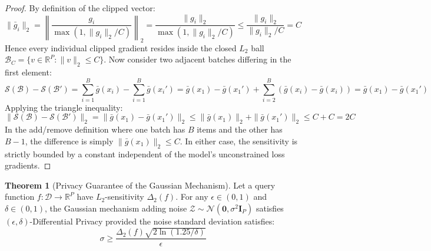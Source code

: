\documentclass[11pt,a4paper]{article}
\theoremstyle{definition}
\newtheorem{theorem}{\textbf{Theorem}}[section]
\begin{document}
\begin{proof}
By definition of the clipped vector:
\begin{equation}
\|\bar{g}_i\|_2 = \left\| \frac{g_i}{\max(1, \|g_i\|_2 / C)} \right\|_2 = \frac{\|g_i\|_2}{\max(1, \|g_i\|_2 / C)} \le \frac{\|g_i\|_2}{\|g_i\|_2 / C} = C
\end{equation}
Hence every individual clipped gradient resides inside the closed $L_2$ ball $\mathcal{B}_C = \{v \in \mathbb{R}^P : \|v\|_2 \le C\}$.
Now consider two adjacent batches differing in the first element:
\begin{equation}
\mathcal{S}(\mathcal{B}) - \mathcal{S}(\mathcal{B}') = \sum_{i=1}^B \bar{g}(x_i) - \sum_{i=1}^B \bar{g}(x_i') = \bar{g}(x_1) - \bar{g}(x_1') + \sum_{i=2}^B (\bar{g}(x_i) - \bar{g}(x_i)) = \bar{g}(x_1) - \bar{g}(x_1')
\end{equation}
Applying the triangle inequality:
\begin{equation}
\|\mathcal{S}(\mathcal{B}) - \mathcal{S}(\mathcal{B}')\|_2 = \|\bar{g}(x_1) - \bar{g}(x_1')\|_2 \le \|\bar{g}(x_1)\|_2 + \|\bar{g}(x_1')\|_2 \le C + C = 2C
\end{equation}
In the add/remove definition where one batch has $B$ items and the other has $B-1$, the difference is simply $\|\bar{g}(x_1)\|_2 \le C$. In either case, the sensitivity is strictly bounded by a constant independent of the model's unconstrained loss gradients.
\end{proof}

\begin{theorem}[Privacy Guarantee of the Gaussian Mechanism]
Let a query function $f: \mathcal{D} \to \mathbb{R}^P$ have $L_2$-sensitivity $\Delta_2(f)$. For any $\epsilon \in (0, 1)$ and $\delta \in (0, 1)$, the Gaussian mechanism adding noise $\mathcal{Z} \sim \mathcal{N}\left(\mathbf{0}, \sigma^2 \mathbf{I}_P\right)$ satisfies $(\epsilon, \delta)$-Differential Privacy provided the noise standard deviation satisfies:
{\boldmath
\begin{equation}
\sigma \ge \frac{\Delta_2(f) \sqrt{2 \ln(1.25 / \delta)}}{\epsilon}
\end{equation}
}
\end{theorem}
\end{document}
